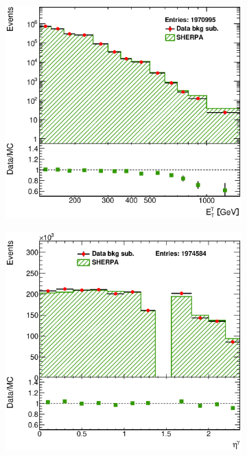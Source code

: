 \documentclass[12pt, twoside]{article}
\numberwithin{equation}{section}
\numberwithin{figure}{section}
\newenvironment{changemargin}[2]{%
\begin{list}{}{%
\setlength{\topsep}{0pt}%
\setlength{\leftmargin}{#1}%
\setlength{\rightmargin}{#2}%
\setlength{\listparindent}{\parindent}%
\setlength{\itemindent}{\parindent}%
\setlength{\parsep}{\parskip}%
}%
\item[]}{\end{list}}
\begin{document}
\begin{figure}
    \centering
    \checkoddpage
    \ifoddpage
        \begin{changemargin}{-1.0cm}{-0.75cm}
    \else
        \begin{changemargin}{-0.75cm}{-1.0cm}
    \fi
        \begin{subfigure}[b]{0.37\textwidth}
            \includegraphics[width=\textwidth]{./images/BackgroundSubtractedSherpa/SIG_EVENTS-101.eps}
            \subcaption{}
            \label{fig:BSEtPhotonSHERPA}
        \end{subfigure}
        \begin{subfigure}[b]{0.37\textwidth}
            \includegraphics[width=\textwidth]{./images/BackgroundSubtractedSherpa/SIG_EVENTS-102.eps}

\end{subfigure}
\end{changemargin}
\end{changemargin}
\end{figure}
\end{document}
